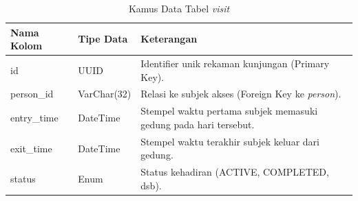 \begin{table}[H]
    \centering
    \caption{Kamus Data Tabel \textit{visit}}
    \label{tab:kamus_visit}
    \begin{tabular}{|l|l|p{8cm}|}
        \hline
        \textbf{Nama Kolom} & \textbf{Tipe Data} & \textbf{Keterangan} \\
        \hline
        id & UUID & Identifier unik rekaman kunjungan (Primary Key). \\
        \hline
        person\_id & VarChar(32) & Relasi ke subjek akses (Foreign Key ke \textit{person}). \\
        \hline
        entry\_time & DateTime & Stempel waktu pertama subjek memasuki gedung pada hari tersebut. \\
        \hline
        exit\_time & DateTime & Stempel waktu terakhir subjek keluar dari gedung. \\
        \hline
        status & Enum & Status kehadiran (ACTIVE, COMPLETED, dsb). \\
        \hline
    \end{tabular}
\end{table}